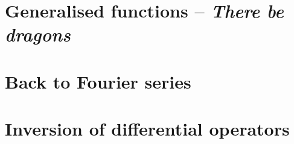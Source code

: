 \section{Generalised functions -- \textit{There be dragons}}
\section{Back to Fourier series}
\section{Inversion of differential operators}